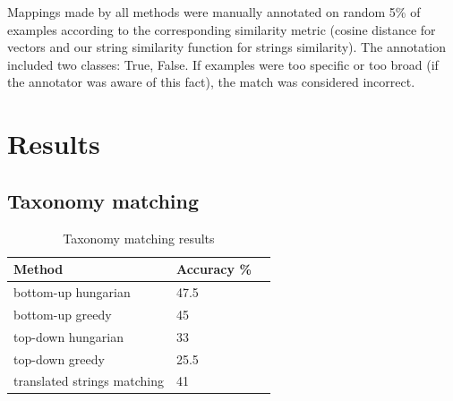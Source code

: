 \documentclass[11pt,a4paper]{article}
\begin{document}
Mappings made by all methods were manually annotated on random 5\% of examples according to the corresponding similarity metric (cosine distance for vectors and our string similarity function for strings similarity). The annotation included two classes: True, False. If examples were too specific or too broad (if the annotator was aware of this fact), the match was considered incorrect.
\section{Results}

\subsection{Taxonomy matching}
        \begin{table}[!htbp]
        \small
        \caption{Taxonomy matching results}
        \label{table-taxonomies-results}
        \centering
        \begin{tabular}{|l|l|l|}
        \hline
        {Method} & {Accuracy \%} \\ \hline
        bottom-up hungarian & 47.5 \\ \hline
        bottom-up greedy & 45 \\ \hline
        top-down hungarian & 33 \\ \hline
        top-down greedy & 25.5 \\ \hline
        translated strings matching & 41 \\
        \hline
        \end{tabular}
\end{table}
\end{document}
